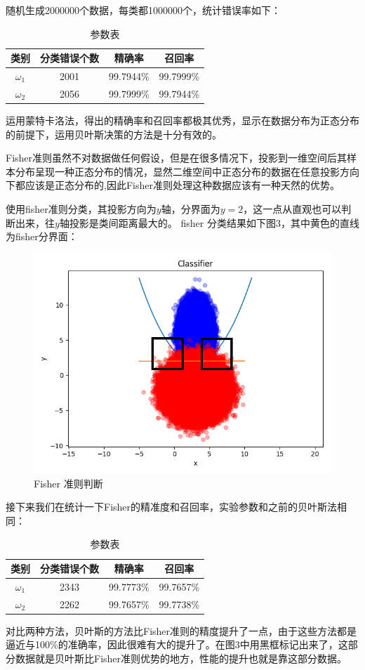 \documentclass{article}
\newcommand{\hs}{\hspace{2em}}
\begin{document}
\hs 随机生成2000000个数据，每类都1000000个，统计错误率如下：
\begin{table}[htbp]
	\centering
	\begin{tabular}{cccc}
		\hline 
		类别 & 分类错误个数 &  精确率 & 召回率  \\
		\hline
		$\omega_1$ & 2001 & 99.7944\% & 99.7999\% \\
		$\omega_2$ & 2056 & 99.7999\% & 99.7944\% \\
		\hline
	\end{tabular}
	\caption{参数表}
\end{table}

\hs 运用蒙特卡洛法，得出的精确率和召回率都极其优秀，显示在数据分布为正态分布的前提下，运用贝叶斯决策的方法是十分有效的。\\

{}

\hs Fisher准则虽然不对数据做任何假设，但是在很多情况下，投影到一维空间后其样本分布呈现一种正态分布的情况，显然二维空间中正态分布的数据在任意投影方向下都应该是正态分布的,因此Fisher准则处理这种数据应该有一种天然的优势。 

\hs  使用fisher准则分类，其投影方向为$y$轴，分界面为$y=2$，这一点从直观也可以判断出来，往$y$轴投影是类间距离最大的。 fisher 分类结果如下图3，其中黄色的直线为fisher分界面：
\begin{figure}[htbp]
	\centering
	\includegraphics[width=0.6\linewidth]{img//fig3.png}
	\caption{Fisher 准则判断}
\end{figure}

\hs 接下来我们在统计一下Fisher的精准度和召回率，实验参数和之前的贝叶斯法相同：
\begin{table}[htbp]
	\centering
	\begin{tabular}{cccc}
		\hline 
		类别 & 分类错误个数 &  精确率 & 召回率  \\
		\hline
		$\omega_1$ & 2343 & 99.7773\% & 99.7657\% \\
		$\omega_2$ & 2262 & 99.7657\% & 99.7738\% \\
		\hline
	\end{tabular}
	\caption{参数表}
\end{table}

对比两种方法，贝叶斯的方法比Fisher准则的精度提升了一点，由于这些方法都是逼近与100\%的准确率，因此很难有大的提升了。在图3中用黑框标记出来了，这部分数据就是贝叶斯比Fisher准则优势的地方，性能的提升也就是靠这部分数据。
\end{document}
